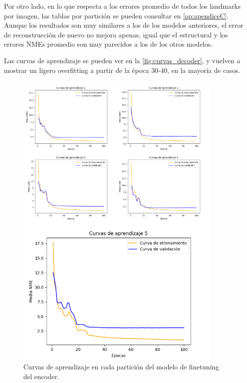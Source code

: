         \medskip

        \noindent Por otro lado, en lo que respecta a los errores promedio de todos los landmarks por imagen, las tablas por partición se pueden consultar en \autoref{ap:apendiceC}. Aunque los resultados son muy similares a los de los modelos anteriores, el error de reconstrucción de nuevo no mejora apenas, igual que el estructural y los errores NMEs promedio son muy parecidos a los de los otros modelos. 

        \medskip

        \noindent Las curvas de aprendizaje se pueden ver en la \autoref{fig:curvas_decoder}, y vuelven a mostrar un ligero overfitting a partir de la época $30$-$40$, en la mayoría de casos. 
        
        \begin{figure}[H]
            \centering
            \includegraphics[width=0.9\textwidth]{img/curvas_decoder.png}
            \caption{Curvas de aprendizaje en cada partición del modelo de finetuning del encoder.}
            \label{fig:curvas_decoder}
        \end{figure}

